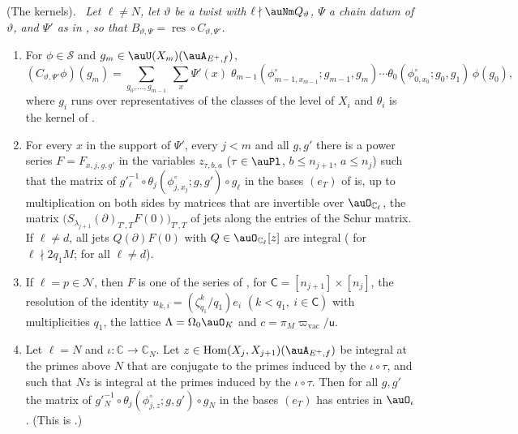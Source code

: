 \documentclass[10pt]{amsart}
\theoremstyle{definition}
\theoremstyle{remark}
\newcommand{\C}{\mathbb C}
\providecommand{\auS}{\mathcal S}
\newenvironment{quotedthm}[2]{\par\medskip\noindent\begingroup
  \textbf{#1}#2.\ \itshape\ignorespaces}{\endgroup\par\medskip}
\begin{document}
\begin{quotedthm}{\cite[Lemma~4.13]{P49}}{ (The kernels)}
Let $\ell\ne N$, let $\vartheta$ be a twist with $\ell\nmid\auNm Q_\vartheta$, $\Psi$ a chain datum
of $\vartheta$, and $\Psi'$ as in {\cite[Proposition~14.25]{P46}}, so that
$B_{\vartheta,\Psi}=\operatorname{res}\circ C_{\vartheta,\Psi'}$.
\begin{enumerate}
\item[(K0)] For $\phi\in\auS$ and $g_m\in\auU(X_m)(\auA_{E^+,f})$,
\[
(C_{\vartheta,\Psi'}\phi)(g_m)=\sum_{g_0,\dots,g_{m-1}}\ \sum_x\Psi'(x)\;\theta_{m-1}
(\phi^\circ_{m-1,x_{m-1}};g_{m-1},g_m)\cdots\theta_0(\phi^\circ_{0,x_0};g_0,g_1)\,\phi(g_0),
\]
where $g_i$ runs over representatives of the classes of the level of $X_i$ and $\theta_i$ is the
kernel of {\cite[\S14.8]{P46}}.
\item[(K1)] For every $x$ in the support of $\Psi'$, every $j<m$ and all $g,g'$ there is a power
series $F=F_{x,j,g,g'}$ in the variables $z_{\tau,b,a}$ ($\tau\in\auPl$, $b\le n_{j+1}$, $a\le n_j$)
such that the matrix of $g'^{-1}_\ell\circ\theta_j(\phi^\circ_{j,x_j};g,g')\circ g_\ell$ in the
bases $(e_T)$ of {\cite[\S6.1]{P49}} is, up to multiplication on both sides by matrices that are
invertible over $\auO_{\C_\ell}$, the matrix
$\bigl(S_{\lambda_{j+1}}(\partial)_{T',T}F(0)\bigr)_{T',T}$ of jets along the entries of the Schur
matrix. If $\ell\ne d$, all jets $Q(\partial)F(0)$ with $Q\in\auO_{\C_\ell}[z]$ are integral
({\cite[Proposition~5.30]{P49}} for $\ell\nmid2q_1M$; {\cite[Corollary~7.16(a)]{P49}} for all $\ell\ne d$).
\item[(K2)] If $\ell=p\in\mathcal N$, then $F$ is one of the series of
{\cite[Proposition~4.12]{P49}}, for $\mathsf C=[n_{j+1}]\times[n_j]$, the resolution of the identity
$u_{k,i}=(\zeta_{q_1}^k/q_1)e_i$ $(k<q_1,\ i\in\mathsf C)$ with multiplicities $q_1$, the lattice
$\Lambda=\Omega_0\auO_K$ and $c=\pi_M\varpi_{\mathrm{vac}}/\mathsf u$.
\item[(K1$_N$)] Let $\ell=N$ and $\iota\colon\C\to\C_N$. Let $z\in\operatorname{Hom}(X_j,X_{j+1})(\auA_{E^+,f})$
be integral at the primes above $N$ that are conjugate to the primes induced by the $\iota\circ\tau$,
and such that $Nz$ is integral at the primes induced by the $\iota\circ\tau$. Then for all $g,g'$ the
matrix of $g'^{-1}_N\circ\theta_j(\phi^\circ_{j,z};g,g')\circ g_N$ in the bases $(e_T)$ has entries in
$\auO_\iota$. (This is {\cite[Lemma~6.20]{P49}}.)
\end{enumerate}
\end{quotedthm}
\end{document}
